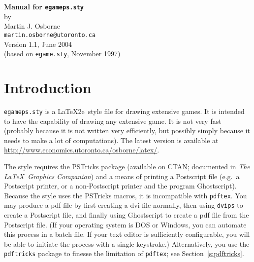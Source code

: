 \documentclass[12pt]{article}
\begin{document}
\renewcommand{\descriptionlabel}[1]{\hspace\labelsep
                                \normalfont #1\phantom{.}}

\begin{center}
{\bfseries Manual for {\tt egameps.sty}}\\
by\\
Martin J. Osborne\\
{\tt martin.osborne@utoronto.ca}\\
Version 1.1, June 2004\\
(based on \texttt{egame.sty}, November 1997)
\end{center}


\section{Introduction}
{\tt egameps.sty} is a \LaTeX2e\ style file for drawing extensive games.  It
is intended to have the capability of drawing any extensive game.  It is not
very fast (probably because it is not written very efficiently, but possibly
simply because it needs to make a lot of computations).  The latest version is
available at \url{http://www.economics.utoronto.ca/osborne/latex/}.

The style requires the PSTricks package (available on CTAN; documented in
\emph{The \LaTeX\ Graphics Companion}) and a means of printing a Postscript
file (e.g.\ a Postscript printer, or a non-Postscript printer and the program
Ghostscript).  Because the style uses the PSTricks macros, it is incompatible
with \verb+pdftex+.  You may produce a pdf file by first creating a dvi file
normally, then using \verb+dvips+ to create a Postscript file, and finally
using Ghostscript to create a pdf file from the Postscript file.  (If your
operating system is DOS or Windows, you can automate this process in a batch
file.  If your text editor is sufficiently configurable, you will be able to
initiate the process with a single keystroke.)  Alternatively, you use the
\verb+pdftricks+ package to finesse the limitation of \verb+pdftex+; see
Section~\ref{s:pdftricks}.
\end{document}
